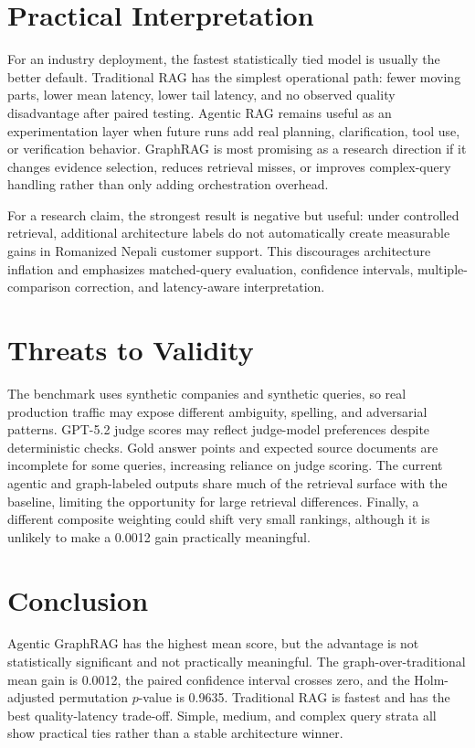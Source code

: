 \documentclass[10pt,twocolumn]{article}
\begin{document}
\section{Practical Interpretation}

For an industry deployment, the fastest statistically tied model is usually the better default. Traditional RAG has the simplest operational path: fewer moving parts, lower mean latency, lower tail latency, and no observed quality disadvantage after paired testing. Agentic RAG remains useful as an experimentation layer when future runs add real planning, clarification, tool use, or verification behavior. GraphRAG is most promising as a research direction if it changes evidence selection, reduces retrieval misses, or improves complex-query handling rather than only adding orchestration overhead.

For a research claim, the strongest result is negative but useful: under controlled retrieval, additional architecture labels do not automatically create measurable gains in Romanized Nepali customer support. This discourages architecture inflation and emphasizes matched-query evaluation, confidence intervals, multiple-comparison correction, and latency-aware interpretation.

\section{Threats to Validity}

The benchmark uses synthetic companies and synthetic queries, so real production traffic may expose different ambiguity, spelling, and adversarial patterns. GPT-5.2 judge scores may reflect judge-model preferences despite deterministic checks. Gold answer points and expected source documents are incomplete for some queries, increasing reliance on judge scoring. The current agentic and graph-labeled outputs share much of the retrieval surface with the baseline, limiting the opportunity for large retrieval differences. Finally, a different composite weighting could shift very small rankings, although it is unlikely to make a 0.0012 gain practically meaningful.

\section{Conclusion}

Agentic GraphRAG has the highest mean score, but the advantage is not statistically significant and not practically meaningful. The graph-over-traditional mean gain is 0.0012, the paired confidence interval crosses zero, and the Holm-adjusted permutation $p$-value is 0.9635. Traditional RAG is fastest and has the best quality-latency trade-off. Simple, medium, and complex query strata all show practical ties rather than a stable architecture winner.
\end{document}

